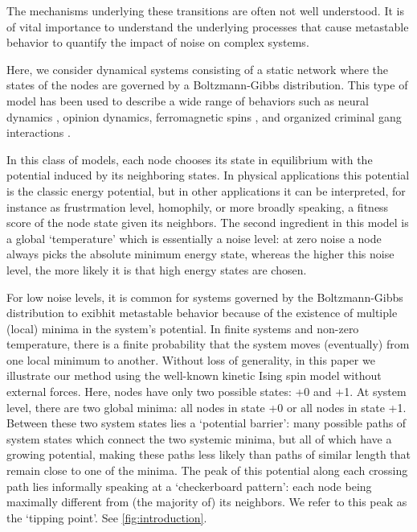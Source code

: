 \documentclass[a4paper, 11pt, twocolumn]{article}
\begin{document}
The mechanisms  underlying these  transitions are  often not well understood. It is of vital importance to understand the underlying  processes  that  cause  metastable  behavior  to quantify the impact of noise on complex systems.

Here, we  consider dynamical systems consisting of a static network where the states of the nodes are governed by a Boltzmann-Gibbs distribution. This type of model has been used to describe a wide range of behaviors such as  neural dynamics \cite{Hopfield1982b}, opinion dynamics,  ferromagnetic  spins \cite{Glauber1963}, and  organized criminal  gang  interactions  \cite{DOrsogna2015a}.

In this class of models, each node chooses its state in equilibrium with the potential induced by its neighboring states. In physical applications this potential is the classic energy potential, but in other applications it can be interpreted, for instance as frustrmation level, homophily, or more broadly speaking, a fitness score of the node state given its neighbors. The second ingredient in this model is a global `temperature' which is essentially a noise level: at zero noise a node always picks the absolute minimum energy state, whereas the higher this noise level, the more likely it is that high energy states are chosen.

For low noise levels, it is common for systems governed by the Boltzmann-Gibbs distribution to exibhit metastable behavior because of the existence of multiple (local) minima in the system's potential. In finite systems and non-zero temperature, there is a finite probability that the system moves (eventually) from one local minimum to another. Without loss of generality, in this paper we illustrate our method using the well-known kinetic Ising spin model without external forces. Here, nodes have only two possible states: +0 and +1. At system level, there are two global minima: all nodes in state +0 or all nodes in state +1. Between these two system states lies a `potential barrier': many possible paths of system states which connect the two systemic minima, but all of which have a growing potential, making these paths less likely than paths of similar length that remain close to one of the minima. The peak of this potential along each crossing path lies informally speaking at a `checkerboard pattern': each node being maximally different from (the majority of) its neighbors. We refer to this peak as the `tipping point'. See \cref{fig:introduction}.
\end{document}
